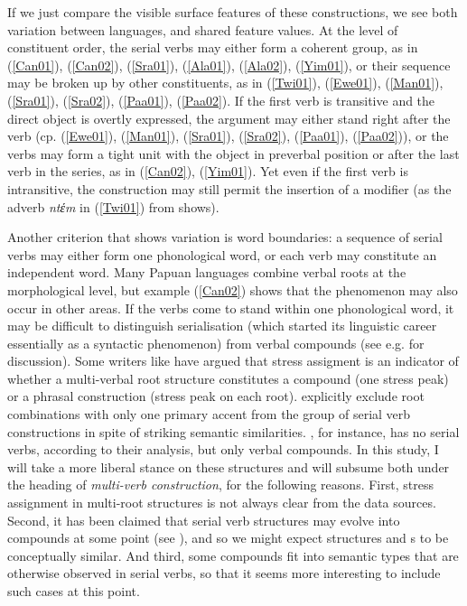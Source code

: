 If we just compare the visible surface features of these constructions, we see both variation between languages, and shared feature values. At the level of constituent order, the serial verbs may either form a coherent group, as in (\ref{Can01}), (\ref{Can02}), (\ref{Sra01}), (\ref{Ala01}), (\ref{Ala02}), (\ref{Yim01}), or their sequence may be broken up by other constituents, as in (\ref{Twi01}), (\ref{Ewe01}), (\ref{Man01}), (\ref{Sra01}), (\ref{Sra02}), (\ref{Paa01}), (\ref{Paa02}). If the first verb is transitive and the direct object is overtly expressed, the argument may either stand right after the verb (cp. (\ref{Ewe01}), (\ref{Man01}), (\ref{Sra01}), (\ref{Sra02}), (\ref{Paa01}), (\ref{Paa02})), or the verbs may form a tight unit with the object in preverbal position or after the last verb in the series, as in (\ref{Can02}), (\ref{Yim01}). Yet even if the first verb is intransitive, the construction may still permit the insertion of a modifier (as the adverb \textit{ntέm} in (\ref{Twi01}) from  shows). 

Another criterion that shows variation is word boundaries: a sequence of serial verbs may either form one phonological word, or each verb may constitute an independent word. Many Papuan languages combine verbal roots at the morphological level, but example (\ref{Can02}) shows that the phenomenon may also occur in other areas. If the verbs come to stand within one phonological word, it may be difficult to distinguish serialisation (which started its linguistic career essentially as a syntactic phenomenon) from verbal compounds (see e.g. \citealt{vanstaden2008serial} for discussion). Some writers like \citet{devries2004} have argued that stress assigment is an indicator of whether a multi-verbal root structure constitutes a compound (one stress peak) or a phrasal construction (stress peak on each root). \citet{vanstaden2008serial} explicitly exclude root combinations with only one primary accent from the group of serial verb constructions in spite of striking semantic similarities. , for instance, has no serial verbs, according to their analysis, but only verbal compounds. In this study, I will take a more liberal stance on these structures and will subsume both under the heading of \textit{multi-verb construction}, for the following reasons. First, stress assignment in multi-root structures is not always clear from the data sources. Second, it has been claimed that serial verb structures may evolve into compounds at some point (see \citealt[27]{vanstaden2008serial}), and so we might expect  structures and s to be conceptually similar. And third, some compounds fit into semantic types that are otherwise observed in serial verbs, so that it seems more interesting to include such cases at this point. 

